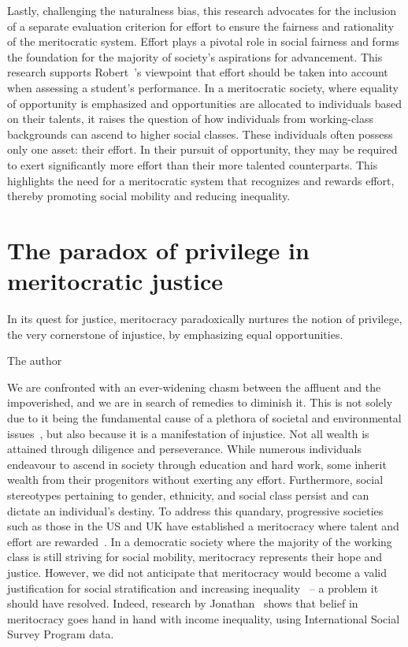 Lastly, challenging the naturalness bias, this research advocates for the inclusion of a separate evaluation criterion for effort to ensure the fairness and rationality of the meritocratic system. Effort plays a pivotal role in social fairness and forms the foundation for the majority of society’s aspirations for advancement. This research supports Robert~\citeauthor{marzano2000transforming}’s viewpoint that effort should be taken into account when assessing a student’s performance. In a meritocratic society, where equality of opportunity is emphasized and opportunities are allocated to individuals based on their talents, it raises the question of how individuals from working-class backgrounds can ascend to higher social classes. These individuals often possess only one asset: their effort. In their pursuit of opportunity, they may be required to exert significantly more effort than their more talented counterparts. This highlights the need for a meritocratic system that recognizes and rewards effort, thereby promoting social mobility and reducing inequality.

\section{The paradox of privilege in meritocratic justice}

\epigraph{In its quest for justice, meritocracy paradoxically nurtures the notion of privilege, the very cornerstone of injustice, by emphasizing equal opportunities.}{The author}

We are confronted with an ever-widening chasm between the affluent and the impoverished, and we are in search of remedies to diminish it. This is not solely due to it being the fundamental cause of a plethora of societal and environmental issues~\citep{harlan2015climate}, but also because it is a manifestation of injustice. Not all wealth is attained through diligence and perseverance. While numerous individuals endeavour to ascend in society through education and hard work, some inherit wealth from their progenitors without exerting any effort. Furthermore, social stereotypes pertaining to gender, ethnicity, and social class persist and can dictate an individual’s destiny. To address this quandary, progressive societies such as those in the US and UK have established a meritocracy where talent and effort are rewarded~\citep{soares2017meritocracy}. In a democratic society where the majority of the working class is still striving for social mobility, meritocracy represents their hope and justice. However, we did not anticipate that meritocracy would become a valid justification for social stratification and increasing inequality~\citep{markovits2019meritocracy} – a problem it should have resolved. Indeed, research by Jonathan~\citet{mijs2021paradox} shows that belief in meritocracy goes hand in hand with income inequality, using International Social Survey Program data.

